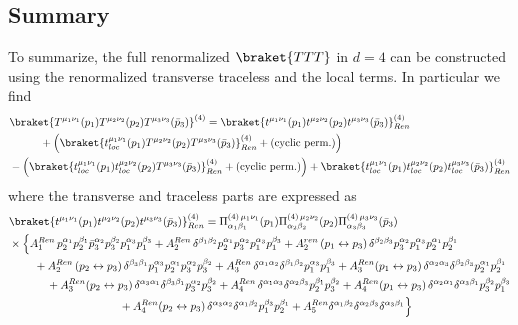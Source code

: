 \documentclass[a4paper,11pt,openright,twoside]{book}
\let\a=\alpha   \let\b=\beta   \let\g=\gamma   \let\d=\delta
\numberwithin{equation}{section}
\begin{document}
{{\subsection{Summary}
To summarize, the full renormalized $\braket{TTT}$ in $d=4$ can be constructed using the renormalized transverse traceless and the local terms. In particular we find
\begin{align}
	&\braket{T^{\mu_1\nu_1}(p_1)T^{\mu_2\nu_2}(p_2)T^{\mu_3\nu_3}(\bar{p}_3)}^{(4)}=\braket{t^{\mu_1\nu_1}(p_1)t^{\mu_2\nu_2}(p_2)t^{\mu_3\nu_3}(\bar{p}_3)}^{(4)}_{Ren}\notag\\
	&\hspace{1cm}+\left(\braket{t_{loc}^{\mu_1\nu_1}(p_1)T^{\mu_2\nu_2}(p_2)T^{\mu_3\nu_3}(\bar{p}_3)}^{(4)}_{Ren}+(\text{cyclic perm.})\right)\notag\\
	&-\left(\braket{t_{loc}^{\mu_1\nu_1}(p_1)t_{loc}^{\mu_2\nu_2}(p_2)T^{\mu_3\nu_3}(\bar{p}_3)}^{(4)}_{Ren}+(\text{cyclic perm.})\right)+\braket{t_{loc}^{\mu_1\nu_1}(p_1)t_{loc}^{\mu_2\nu_2}(p_2)t_{loc}^{\mu_3\nu_3}(\bar{p}_3)}^{(4)}_{Ren}
\end{align} 
where the transverse and traceless parts are expressed as
\begin{align}
	&\braket{t^{\mu_1\nu_1}(p_1)t^{\mu_2\nu_2}(p_2)t^{\mu_3\nu_3}(\bar{p}_3)}^{(4)}_{Ren}=\Pi^{(4)\,\mu_1\nu_1}_{\a_1\b_1}(p_1)\Pi^{(4)\,\mu_2\nu_2}_{\a_2\b_2}(p_2)\Pi^{(4)\,\mu_3\nu_3}_{\a_3\b_3}(\bar{p}_3)\notag\\
	&\times\Big\{A_1^{Ren}\,p_2^{\a_1} p_2^{\b_1} \bar{p}_3^{\a_2} p_3^{\b_2} p_1^{\a_3} p_1^{\b_3}+ A_2^{Ren}\,\d^{\b_1\b_2} p_2^{\a_1} p_3^{\a_2} p_1^{\a_3} p_1^{\b_3} 
	+ A_2^{ren}\,(p_1 \leftrightarrow p_3)\, \d^{\b_2\b_3}  p_3^{\a_2} p_1^{\a_3} p_2^{\a_1} p_2^{\b_1} \notag\\
	&\hspace{0.8cm}+ A_2^{Ren}\,(p_2\leftrightarrow p_3)\, \d^{\b_3\b_1} p_1^{\a_3} p_2^{\a_1}  p_3^{\a_2} p_3^{\b_2}+ A_3^{Ren}\,\d^{\a_1\a_2} \d^{\b_1\b_2}  p_1^{\a_3} p_1^{\b_3} + A_3^{Ren}(p_1\leftrightarrow p_3)\,\d^{\a_2\a_3} \d^{\b_2\b_3}  p_2^{\a_1} p_2^{\b_1} \notag\\
	&\hspace{1.2cm}
	+ A_3^{Ren}(p_2\leftrightarrow p_3)\,\d^{\a_3\a_1} \d^{\b_3\b_1}  p_3^{\a_2} p_3^{\b_2} + A_4^{Ren}\,\d^{\a_1\a_3} \d^{\a_2\b_3}  p_2^{\b_1} p_3^{\b_2} + A_4^{Ren}(p_1\leftrightarrow p_3)\, \d^{\a_2\a_1} \d^{\a_3\b_1}  p_3^{\b_2} p_1^{\b_3} \notag\\
	&\hspace{3.5cm}+ A_4^{Ren}(p_2\leftrightarrow p_3)\, \d^{\a_3\a_2} \d^{\a_1\b_2}  p_1^{\b_3} p_2^{\b_1} + A_5 ^{Ren} \d^{\a_1\b_2}  \d^{\a_2\b_3}  \d^{\a_3\b_1}\Big\}

\end{align}}}
\end{document}
